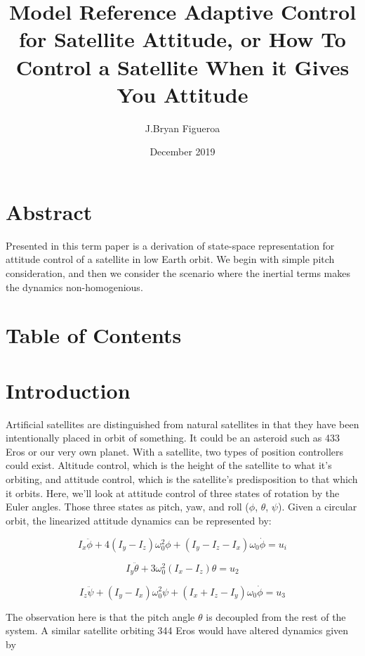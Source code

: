 \documentclass{article}
\title{Model Reference Adaptive Control for Satellite Attitude, or How To Control a Satellite When it Gives You Attitude}
\author{J.Bryan Figueroa}
\date{December 2019}
\begin{document}
\maketitle

\section{Abstract}
Presented in this term paper is a derivation of state-space representation for attitude control of a satellite in low Earth orbit.
We begin with simple pitch consideration, and then we consider the scenario where the inertial terms makes the dynamics non-homogenious.

\section{Table of Contents}

\section{Introduction}
Artificial satellites are distinguished from natural satellites in that they have been intentionally placed in orbit of something.
It could be an asteroid such as 433 Eros or our very own planet.
With a satellite, two types of position controllers could exist.
Altitude control, which is the height of the satellite to what it's orbiting, and attitude control, which is the satellite's predisposition to that which it orbits.
Here, we'll look at attitude control of three states of rotation by the Euler angles.
Those three states as pitch, yaw, and roll ($\phi$, $\theta$, $\psi$).
Given a circular orbit, the linearized attitude dynamics can be represented by:

\begin{equation}
I_{x} \ddot{\phi} +4(I_{y}-I_{z})\omega^{2}_{0}\phi+(I_{y}-I_{z}-I_{x})\omega_{0}\dot{\phi} = u_{i}
\end{equation}

\begin{equation}
I_{y}\ddot{\theta}+3\omega^{2}_{0}(I_{x}-I_{z})\theta = u_{2}
\end{equation}

\begin{equation}
I_{z}\ddot{\psi}+(I_{y}-I_{x})\omega^{2}_{0}\psi + (I_{x} + I_{z} - I_{y})\omega_{0}\dot{\phi} = u_3
\end{equation}

The observation here is that the pitch angle $\theta$ is decoupled from the rest of the system.
A similar satellite orbiting 344 Eros would have altered dynamics given by
\end{document}
